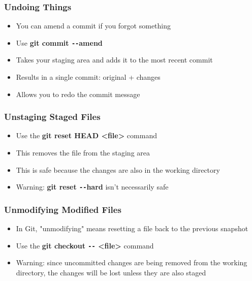 \documentclass{beamer}
\begin{document}
\begin{frame}
	\frametitle{Undoing Things}
	\begin{itemize}
		\item{You can amend a commit if you forgot something}
		\item{Use \textbf{git commit \texttt{-{}-}amend}}
		\item{Takes your staging area and adds it to the most recent commit}
		\item{Results in a single commit: original + changes}
		\item{Allows you to redo the commit message}
	\end{itemize}
\end{frame}

\begin{frame}
	\frametitle{Unstaging Staged Files}
	\begin{itemize}
		\item{Use the \textbf{git reset HEAD \textless{}file\textgreater{}} command}
		\item{This removes the file from the staging area}
		\item{This is safe because the changes are also in the working directory}
		\item{Warning: \textbf{git reset \texttt{-{}-}hard} isn't necessarily safe}
	\end{itemize}
\end{frame}

\begin{frame}
	\frametitle{Unmodifying Modified Files}
	\begin{itemize}
		\item{In Git, "unmodifying" means resetting a file back to the previous snapshot}
		\item{Use the \textbf{git checkout \texttt{-{}-} \textless{}file\textgreater{}} command}
		\item{Warning: since uncommitted changes are being removed from the working directory, the changes will be lost unless they are also staged}
	\end{itemize}
\end{frame}
\end{document}
